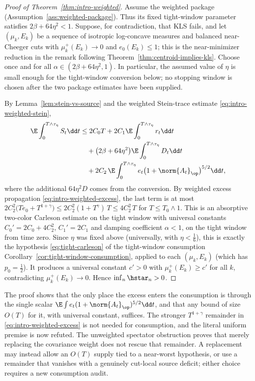 \documentclass[../../main.tex]{subfiles}
\begin{document}
\begin{proof}[Proof of Theorem~\ref{thm:intro-weighted}]
Assume the weighted package (Assumption~\ref{ass:weighted-package}). Thus its fixed tight-window
parameter satisfies $2\beta+64\eta^2<1$. Suppose, for contradiction, that KLS fails, and let
$(\mu_k,E_k)$ be a sequence
of isotropic log-concave measures and balanced near-Cheeger cuts with $\mu_k^+(E_k)\to0$ and
$e_0(E_k)\le1$; this is the near-minimizer reduction in the remark following
Theorem~\ref{thm:centroid-implies-kls}. Choose once and for all
$\alpha\in(2\beta+64\eta^2,1)$.  In particular, the assumed value of $\eta$ is small enough for
the tight-window conversion below; no stopping window is chosen after the two package estimates
have been supplied.

By Lemma~\ref{lem:stein-vs-source} and the weighted Stein-trace estimate
\eqref{eq:intro-weighted-stein},
\[
\begin{aligned}
  \E\int_0^{T\wedge\tau_\eta}S_t\dd t
  &\le2C_0T+2C_1\E\int_0^{T\wedge\tau_\eta}r_t\dd t \\
  &\quad
  +\bigl(2\beta+64\eta^2\bigr)\E\int_0^{T\wedge\tau_\eta}D_t\dd t \\
  &\quad
  +2C_2\,\E\int_0^{T\wedge\tau_\eta}
  e_t\bigl(1+\norm{A_t}_\op\bigr)^{5/2}\dd t ,
\end{aligned}
\]
where the additional $64\eta^2D$ comes from the conversion. By weighted excess propagation
\eqref{eq:intro-weighted-excess}, the last term is at most
$2C_2^2\bigl(Te_0+T^{1+\gamma}\bigr)\le2C_2^2(1+T^\gamma)\,T\le4C_2^2\,T$ for $T\le T_0\wedge1$.
This is an absorptive two-color Carleson estimate on the tight window with universal constants
$C_0'=2C_0+4C_2^2$, $C_1'=2C_1$ and damping coefficient $\alpha<1$, on the tight window from
time zero. Since $\eta$ was fixed above (universally, with $\eta<\tfrac16$), this is exactly the
hypothesis \eqref{eq:tight-carleson} of the tight-window consumption
Corollary~\ref{cor:tight-window-consumption}, applied to each $(\mu_k,E_k)$ (which has
$p_0=\tfrac12$). It produces a universal constant $c'>0$ with $\mu_k^+(E_k)\ge c'$ for all $k$,
contradicting $\mu_k^+(E_k)\to0$. Hence $\inf_n\hstar_n>0$.
\end{proof}

\begin{remark}
The proof shows that the only place the excess enters the consumption is through the single
scalar $\E\int e_t(1+\norm{A_t}_\op)^{5/2}\dd t$, and that any bound of size $O(T)$ for it,
with universal constant, suffices. The stronger $T^{1+\gamma}$ remainder in
\eqref{eq:intro-weighted-excess} is not needed for consumption, and the literal uniform premise
is now refuted. The unweighted spectator obstruction proves that merely replacing the covariance
weight does not rescue that remainder. A replacement may instead allow an $O(T)$ supply tied to
a near-worst hypothesis, or use a remainder that vanishes with a genuinely cut-local source
deficit; either choice requires a new consumption audit.
\end{remark}
\end{document}
